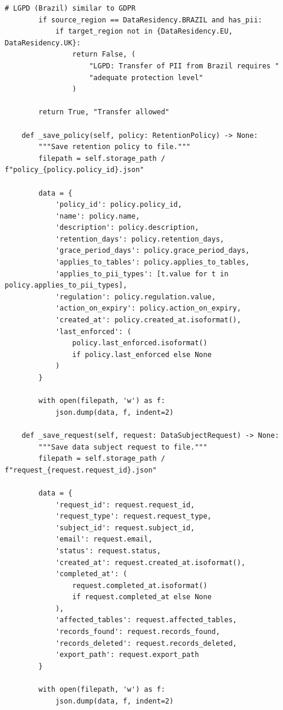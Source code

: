 \begin{lstlisting}[style=python, caption={Comprehensive data privacy compliance framework}]
        # LGPD (Brazil) similar to GDPR
        if source_region == DataResidency.BRAZIL and has_pii:
            if target_region not in {DataResidency.EU, DataResidency.UK}:
                return False, (
                    "LGPD: Transfer of PII from Brazil requires "
                    "adequate protection level"
                )

        return True, "Transfer allowed"

    def _save_policy(self, policy: RetentionPolicy) -> None:
        """Save retention policy to file."""
        filepath = self.storage_path / f"policy_{policy.policy_id}.json"

        data = {
            'policy_id': policy.policy_id,
            'name': policy.name,
            'description': policy.description,
            'retention_days': policy.retention_days,
            'grace_period_days': policy.grace_period_days,
            'applies_to_tables': policy.applies_to_tables,
            'applies_to_pii_types': [t.value for t in policy.applies_to_pii_types],
            'regulation': policy.regulation.value,
            'action_on_expiry': policy.action_on_expiry,
            'created_at': policy.created_at.isoformat(),
            'last_enforced': (
                policy.last_enforced.isoformat()
                if policy.last_enforced else None
            )
        }

        with open(filepath, 'w') as f:
            json.dump(data, f, indent=2)

    def _save_request(self, request: DataSubjectRequest) -> None:
        """Save data subject request to file."""
        filepath = self.storage_path / f"request_{request.request_id}.json"

        data = {
            'request_id': request.request_id,
            'request_type': request.request_type,
            'subject_id': request.subject_id,
            'email': request.email,
            'status': request.status,
            'created_at': request.created_at.isoformat(),
            'completed_at': (
                request.completed_at.isoformat()
                if request.completed_at else None
            ),
            'affected_tables': request.affected_tables,
            'records_found': request.records_found,
            'records_deleted': request.records_deleted,
            'export_path': request.export_path
        }

        with open(filepath, 'w') as f:
            json.dump(data, f, indent=2)


\end{lstlisting}

